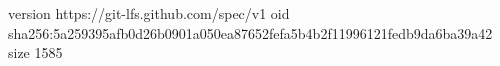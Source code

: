 version https://git-lfs.github.com/spec/v1
oid sha256:5a259395afb0d26b0901a050ea87652fefa5b4b2f11996121fedb9da6ba39a42
size 1585
